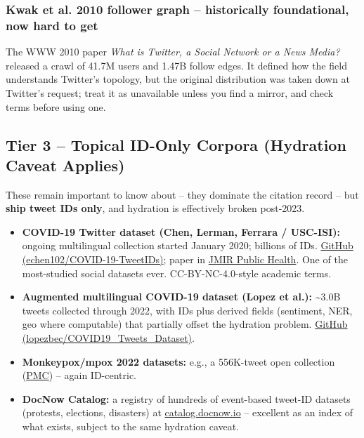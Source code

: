 \documentclass[twocolumn,10pt,letterpaper]{article}
\begin{document}
\subsubsection{Kwak et al. 2010 follower graph -- historically foundational, now hard to get}

The WWW 2010 paper \textit{What is Twitter, a Social Network or a News Media?} released a crawl of 41.7M users and 1.47B follow edges. It defined how the field understands Twitter's topology, but the original distribution was taken down at Twitter's request; treat it as unavailable unless you find a mirror, and check terms before using one.


\subsection{Tier 3 -- Topical ID-Only Corpora (Hydration Caveat Applies)}

These remain important to know about -- they dominate the citation record -- but \textbf{ship tweet IDs only}, and hydration is effectively broken post-2023.


\begin{itemize}
\setlength{\itemsep}{0pt}
\setlength{\parskip}{0pt}
  \item \textbf{COVID-19 Twitter dataset (Chen, Lerman, Ferrara / USC-ISI):} ongoing multilingual collection started January 2020; billions of IDs. \href{https://github.com/echen102/COVID-19-TweetIDs}{GitHub (echen102/COVID-19-TweetIDs)}; paper in \href{https://publichealth.jmir.org/2020/2/e19273/}{JMIR Public Health}. One of the most-studied social datasets ever. CC-BY-NC-4.0-style academic terms.
  \item \textbf{Augmented multilingual COVID-19 dataset (Lopez et al.):} \textasciitilde{}3.0B tweets collected through 2022, with IDs plus derived fields (sentiment, NER, geo where computable) that partially offset the hydration problem. \href{https://github.com/lopezbec/COVID19\_Tweets\_Dataset}{GitHub (lopezbec/COVID19\_Tweets\_Dataset)}.
  \item \textbf{Monkeypox/mpox 2022 datasets:} e.g., a 556K-tweet open collection (\href{https://www.ncbi.nlm.nih.gov/pmc/articles/PMC9680479/}{PMC}) -- again ID-centric.
  \item \textbf{DocNow Catalog:} a registry of hundreds of event-based tweet-ID datasets (protests, elections, disasters) at \href{https://catalog.docnow.io/}{catalog.docnow.io} -- excellent as an index of what exists, subject to the same hydration caveat.
\end{itemize}
\end{document}
